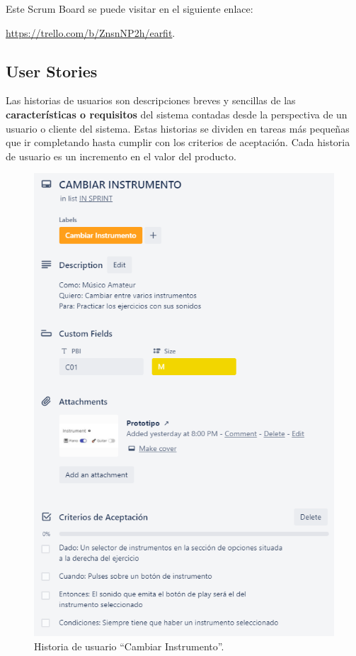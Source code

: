 \documentclass[12pt,twoside,titlepage]{report}
\begin{document}
Este Scrum Board se puede visitar en el siguiente enlace: 

\url{https://trello.com/b/ZnsnNP2h/earfit}.

\subsection{User Stories}

Las historias de usuarios son descripciones breves y sencillas de las \textbf{características o requisitos} del sistema contadas desde la perspectiva de un usuario o cliente del sistema. Estas historias se dividen en tareas más pequeñas que ir completando hasta cumplir con los criterios de aceptación. Cada historia de usuario es un incremento en el valor del producto.

\begin{figure}[H]
    \centering
    \includegraphics[scale=0.7]{Scrum/UserStory}
    \caption{Historia de usuario ``Cambiar Instrumento''.}
    \label{fig:UserStory}
\end{figure}
\end{document}
